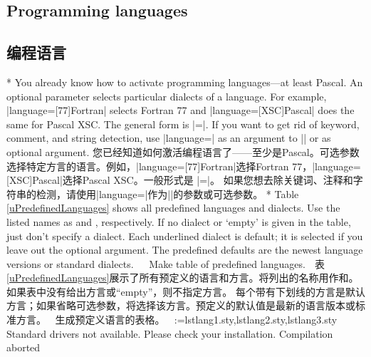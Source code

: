 \begin{paracol}{2}
\subsection{Programming languages}\label{uProgrammingLanguages}
\switchcolumn
\subsection{编程语言}
\switchcolumn[0]*%
You already know how to activate programming languages---at least Pascal.
An optional parameter selects particular dialects of a language. For example,
|language=[77]Fortran| selects Fortran 77 and |language=[XSC]Pascal| does the
same for Pascal XSC. The general form is
   {\rstyle{}}|=|.
If you want to get rid of keyword, comment, and string detection, use
|language={}| as an argument to |\lstset| or as optional argument.
\switchcolumn
您已经知道如何激活编程语言了——至少是Pascal。可选参数选择特定方言的语言。例如，|language=[77]Fortran|选择Fortran 77，|language=[XSC]Pascal|选择Pascal XSC。一般形式是
{\rstyle{}}|=|。
如果您想去除关键词、注释和字符串的检测，请使用|language={}|作为|\lstset|的参数或可选参数。
\switchcolumn[0]*%
Table \ref{uPredefinedLanguages} shows all predefined languages and dialects.
Use the listed names as  and , respectively. If
no dialect or `empty' is given in the table, just don't specify a dialect.
Each underlined dialect is default; it is selected if you leave out
the optional argument. The predefined defaults are the newest language
versions or standard dialects.
^^A
^^A  Make table of predefined languages.
^^A
\switchcolumn
表\ref{uPredefinedLanguages}展示了所有预定义的语言和方言。将列出的名称用作和。如果表中没有给出方言或“empty”，则不指定方言。
每个带有下划线的方言是默认方言；如果省略可选参数，将选择该方言。预定义的默认值是最新的语言版本或标准方言。
^^A
^^A 生成预定义语言的表格。
^^A
\let\lstlanguages\empty
\makeatletter
\@for\lst@temp:={lstlang1.sty,lstlang2.sty,lstlang3.sty}\do
   {\IfFileExists\lst@temp{}{\let\lstlanguages\relax}}
\makeatother
\ifx\lstlanguages\relax
       {Standard drivers not available.\MessageBreak
        Please check your installation.\MessageBreak
        Compilation aborted}

\end{paracol}
